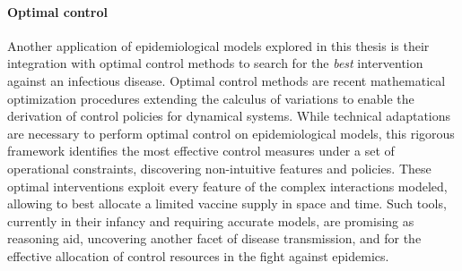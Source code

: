 \paragraph{Optimal control} Another application of epidemiological models explored in this thesis is their integration with optimal control methods to search for the \textit{best} intervention against an infectious disease. Optimal control methods are recent mathematical optimization procedures extending the calculus of variations to enable the derivation of control policies for dynamical systems. While technical adaptations are necessary to perform optimal control on epidemiological models, this rigorous framework identifies the most effective control measures under a set of operational constraints, discovering non-intuitive features and policies. These optimal interventions exploit every feature of the complex interactions modeled, allowing to \eg best allocate a limited vaccine supply in space and time. Such tools, currently in their infancy and requiring accurate models, are promising as reasoning aid, uncovering another facet of disease transmission, and for the effective allocation of control resources in the fight against epidemics.




